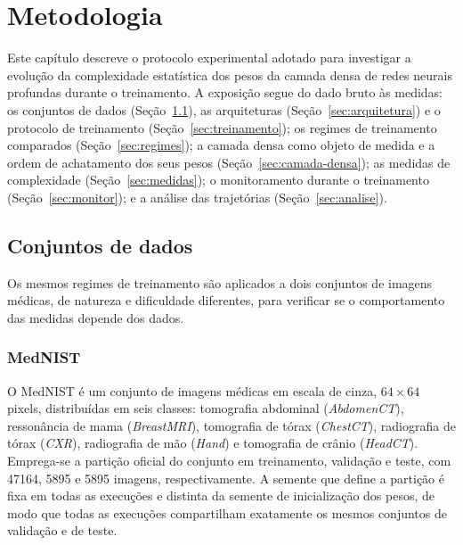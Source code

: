 
\chapter{Metodologia}
\label{ch:metodologia}

Este capítulo descreve o protocolo experimental adotado para investigar a
evolução da complexidade estatística dos pesos da camada densa de redes
neurais profundas durante o treinamento. A exposição segue do dado bruto às
medidas: os conjuntos de dados (Seção~\ref{sec:dados}), as arquiteturas
(Seção~\ref{sec:arquitetura}) e o protocolo de treinamento
(Seção~\ref{sec:treinamento}); os regimes de treinamento comparados
(Seção~\ref{sec:regimes}); a camada densa como objeto de medida e a
ordem de achatamento dos seus pesos (Seção~\ref{sec:camada-densa}); as
medidas de complexidade (Seção~\ref{sec:medidas}); o monitoramento durante o
treinamento (Seção~\ref{sec:monitor}); e a análise das trajetórias
(Seção~\ref{sec:analise}).

\section{Conjuntos de dados}
\label{sec:dados}

Os mesmos regimes de treinamento são aplicados a dois conjuntos de imagens
médicas, de natureza e dificuldade diferentes, para verificar se o
comportamento das medidas depende dos dados.

\subsection{MedNIST}
\label{sec:dados-mednist}

O MedNIST é um conjunto de imagens médicas em escala de cinza,
$64 \times 64$ pixels, distribuídas em seis classes: tomografia abdominal
(\emph{AbdomenCT}), ressonância de mama (\emph{BreastMRI}), tomografia de
tórax (\emph{ChestCT}), radiografia de tórax (\emph{CXR}), radiografia de mão
(\emph{Hand}) e tomografia de crânio (\emph{HeadCT}). Emprega-se a partição
oficial do conjunto em treinamento, validação e teste, com
\num{47164}, \num{5895} e \num{5895} imagens, respectivamente. A semente que
define a partição é fixa em todas as execuções e distinta da semente de
inicialização dos pesos, de modo que todas as execuções compartilham
exatamente os mesmos conjuntos de validação e de teste.

